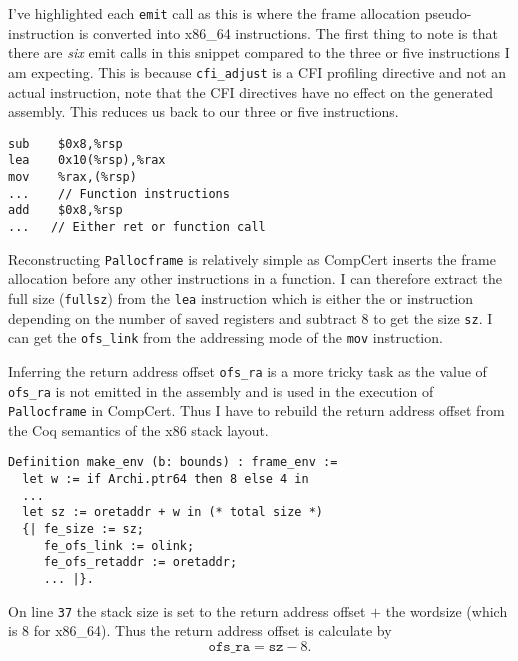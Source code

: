 I've highlighted each \texttt{emit} call as this is where the frame allocation pseudo-instruction is converted into x86\_64 instructions. The first thing to note is that there are \textit{six} emit calls in this snippet compared to the three or five instructions I am expecting. This is because \texttt{cfi\_adjust} is a CFI profiling directive and not an actual instruction, note that the CFI directives have no effect on the generated assembly. This reduces us back to our three or five instructions. 

\begin{lstlisting}[language=x86-64]
sub    $0x8,%rsp
lea    0x10(%rsp),%rax
mov    %rax,(%rsp)
...    // Function instructions
add    $0x8,%rsp
...   // Either ret or function call
\end{lstlisting}

Reconstructing \texttt{Pallocframe} is relatively simple as CompCert inserts the frame allocation before any other instructions in a function. I can therefore extract the full size (\texttt{fullsz}) from the \texttt{lea} instruction which is either the  or  instruction depending on the number of saved registers and subtract 8 to get the size \texttt{sz}. I can get the \texttt{ofs\_link} from the addressing mode of the \texttt{mov} instruction.

Inferring the return address offset \texttt{ofs\_ra} is a more tricky task as the value of \texttt{ofs\_ra} is not emitted in the assembly and is used in the execution of \texttt{Pallocframe} in CompCert. Thus I have to rebuild the return address offset from the Coq semantics of the x86 stack layout.

\begin{lstlisting}[language=Coq, firstnumber=34, caption=Stacklayout.v]
Definition make_env (b: bounds) : frame_env :=
  let w := if Archi.ptr64 then 8 else 4 in
  ...
  let sz := oretaddr + w in (* total size *)
  {| fe_size := sz;
     fe_ofs_link := olink;
     fe_ofs_retaddr := oretaddr;
     ... |}.
\end{lstlisting}

On line \texttt{37} the stack size is set to the return address offset $+$ the wordsize (which is 8 for x86\_64). Thus the return address offset is calculate by
$$\texttt{ofs\_ra} = \texttt{sz} - 8.$$




